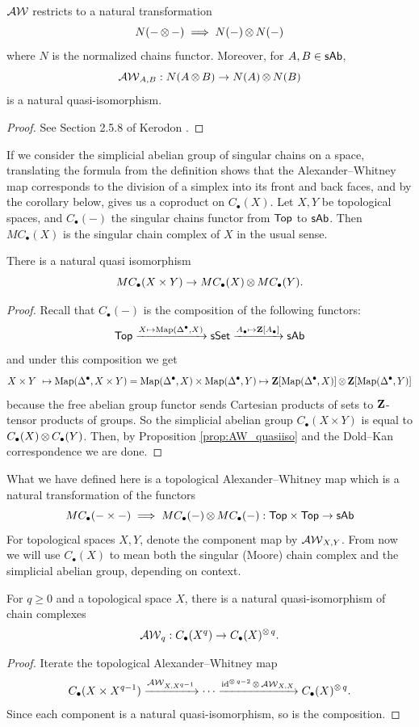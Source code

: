 \begin{prop}\label{prop:AW_quasiiso}
$\operatorname{\mathcal{AW}}$ restricts to a natural transformation 
\[N(-\operatorname{\otimes} -)\implies N(-) \operatorname{\otimes} N(-)\]
where $N$ is the normalized chains functor. Moreover, for $A, B \in \mathsf{sAb}$, 
\[\operatorname{\mathcal{AW}}_{A,B}: N(A\operatorname{\otimes} B) \to N(A)\operatorname{\otimes} N(B)\]
is a natural quasi-isomorphism.
\begin{proof}
See Section 2.5.8 of Kerodon \cite[\href{https://kerodon.net/tag/00S0}{Tag 00S0}]{kerodon}.
\end{proof}
\end{prop}
If we consider the simplicial abelian group of singular chains on a space, translating the formula from the definition shows that the Alexander--Whitney map corresponds to the division of a simplex into its front and back faces, and by the corollary below, gives us a coproduct on $C_\bullet(X)$. Let $X, Y$ be topological spaces, and $C_\bullet(-)$ the singular chains functor from $\mathsf{Top}$ to $\mathsf{sAb}$. Then $MC_\bullet(X)$ is the singular chain complex of $X$ in the usual sense.
\begin{cor}
There is a natural quasi isomorphism   
\[MC_\bullet(X\times Y) \to MC_\bullet(X)\operatorname{\otimes} MC_\bullet(Y).\]
\begin{proof}
Recall that $C_\bullet(-)$ is the composition of the following functors: 
\[\mathsf{Top} \xrightarrow{X\mapsto \operatorname{Map}(\Delta^\bullet, X)} \mathsf{sSet} \xrightarrow{A_\bullet \mapsto \mathbf{Z}[A_\bullet]} \mathsf{sAb}\]
and under this composition we get 
\[X\times Y\ \mapsto \operatorname{Map}(\Delta^\bullet, X\times Y) = \operatorname{Map}(\Delta^\bullet, X)\times \operatorname{Map}(\Delta^\bullet, Y)  \mapsto \mathbf{Z}[\operatorname{Map}(\Delta^\bullet, X)]\operatorname{\otimes} \mathbf{Z}[\operatorname{Map}(\Delta^\bullet, Y)]\]
because the free abelian group functor sends Cartesian products of sets to $\mathbf{Z}$-tensor products of groups. So the simplicial abelian group $C_\bullet(X\times Y)$ is equal to $C_\bullet(X)\operatorname{\otimes} C_\bullet(Y)$. Then, by Proposition \ref{prop:AW_quasiiso} and the Dold--Kan correspondence we are done.
\end{proof}
\end{cor}
What we have defined here is a topological Alexander--Whitney map which is a natural transformation of the functors
\[MC_\bullet(-\times -)\implies  MC_\bullet(-)\operatorname{\otimes} MC_\bullet(-): \mathsf{Top} \times \mathsf{Top}\to \mathsf{sAb}\]
For topological spaces $X,Y$, denote the component map by $\operatorname{\mathcal{AW}}_{X,Y}$.
From now we will use $C_\bullet(X)$ to mean both the singular (Moore) chain complex and the simplicial abelian group, depending on context. 
\begin{cor}\label{cor:topological_aw}
For $q\geq 0$ and a topological space $X$, there is a natural quasi-isomorphism of chain complexes 
\[\operatorname{\mathcal{AW}}_q: C_\bullet(X^q) \to C_\bullet(X)^{\operatorname{\otimes} q}.\]
\begin{proof}
Iterate the topological Alexander--Whitney map 
\[C_\bullet(X\times X^{q-1}) \xrightarrow{\operatorname{\mathcal{AW}}_{X, X^{q-1}}} \cdots \xrightarrow{\operatorname{id}^{\operatorname{\otimes} q-2}\operatorname{\otimes} \operatorname{\mathcal{AW}}_{X, X}} C_\bullet(X)^{\operatorname{\otimes} q}.\]
Since each component is a natural quasi-isomorphism, so is the composition. 
\end{proof}
\end{cor}
